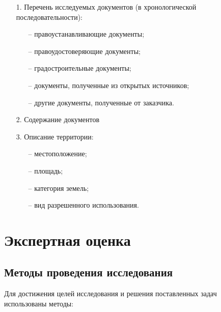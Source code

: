\begin{enumerate}
    \item[1.] Перечень исследуемых документов (в хронологической последовательности):
    \begin{enumerate}
        \item[--] правоустанавливающие документы;
        \item[--] правоудостоверяющие документы;
        \item[--] градостроительные документы;
        \item[--] документы, полученные из открытых источников;
        \item[--] другие документы, полученные от заказчика.
    \end{enumerate}
    \item[2.] Содержание документов
    \item[3.] Описание территории:
    \begin{enumerate}
        \item[--] местоположение;
        \item[--] площадь;
        \item[--] категория земель;
        \item[--] вид разрешенного использования.
    \end{enumerate}
\end{enumerate}

\section{Экспертная оценка}
\label{sec:expert}

\subsection{Методы проведения исследования}
\label{subsec:method}

Для достижения целей исследования и решения поставленных задач использованы методы:

